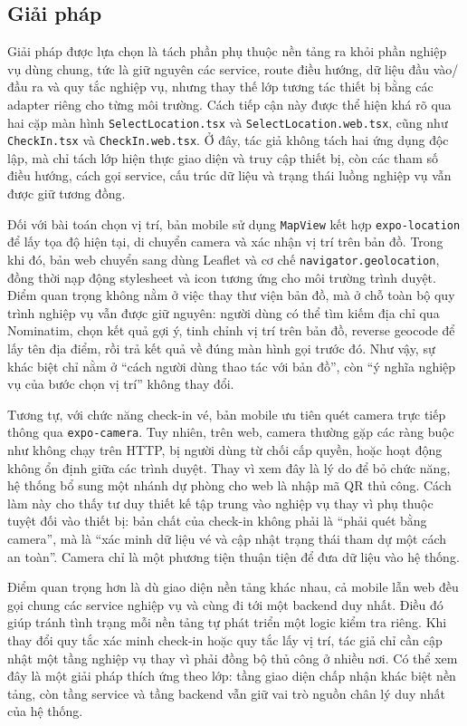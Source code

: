 \documentclass[../DoAn.tex]{subfiles}
\begin{document}
\subsection{Giải pháp}
Giải pháp được lựa chọn là tách phần phụ thuộc nền tảng ra khỏi phần nghiệp vụ dùng chung, tức là giữ nguyên các service, route điều hướng, dữ liệu đầu vào/đầu ra và quy tắc nghiệp vụ, nhưng thay thế lớp tương tác thiết bị bằng các adapter riêng cho từng môi trường. Cách tiếp cận này được thể hiện khá rõ qua hai cặp màn hình \texttt{SelectLocation.tsx} và \texttt{SelectLocation.web.tsx}, cũng như \texttt{CheckIn.tsx} và \texttt{CheckIn.web.tsx}. Ở đây, tác giả không tách hai ứng dụng độc lập, mà chỉ tách lớp hiện thực giao diện và truy cập thiết bị, còn các tham số điều hướng, cách gọi service, cấu trúc dữ liệu và trạng thái luồng nghiệp vụ vẫn được giữ tương đồng.

Đối với bài toán chọn vị trí, bản mobile sử dụng \texttt{MapView} kết hợp \texttt{expo-location} để lấy tọa độ hiện tại, di chuyển camera và xác nhận vị trí trên bản đồ. Trong khi đó, bản web chuyển sang dùng Leaflet và cơ chế \texttt{navigator.geolocation}, đồng thời nạp động stylesheet và icon tương ứng cho môi trường trình duyệt. Điểm quan trọng không nằm ở việc thay thư viện bản đồ, mà ở chỗ toàn bộ quy trình nghiệp vụ vẫn được giữ nguyên: người dùng có thể tìm kiếm địa chỉ qua Nominatim, chọn kết quả gợi ý, tinh chỉnh vị trí trên bản đồ, reverse geocode để lấy tên địa điểm, rồi trả kết quả về đúng màn hình gọi trước đó. Như vậy, sự khác biệt chỉ nằm ở “cách người dùng thao tác với bản đồ”, còn “ý nghĩa nghiệp vụ của bước chọn vị trí” không thay đổi.

Tương tự, với chức năng check-in vé, bản mobile ưu tiên quét camera trực tiếp thông qua \texttt{expo-camera}. Tuy nhiên, trên web, camera thường gặp các ràng buộc như không chạy trên \gls{HTTP}, bị người dùng từ chối cấp quyền, hoặc hoạt động không ổn định giữa các trình duyệt. Thay vì xem đây là lý do để bỏ chức năng, hệ thống bổ sung một nhánh dự phòng cho web là nhập mã \gls{QR} thủ công. Cách làm này cho thấy tư duy thiết kế tập trung vào nghiệp vụ thay vì phụ thuộc tuyệt đối vào thiết bị: bản chất của check-in không phải là “phải quét bằng camera”, mà là “xác minh dữ liệu vé và cập nhật trạng thái tham dự một cách an toàn”. Camera chỉ là một phương tiện thuận tiện để đưa dữ liệu vào hệ thống.

Điểm quan trọng hơn là dù giao diện nền tảng khác nhau, cả mobile lẫn web đều gọi chung các service nghiệp vụ và cùng đi tới một backend duy nhất. Điều đó giúp tránh tình trạng mỗi nền tảng tự phát triển một logic kiểm tra riêng. Khi thay đổi quy tắc xác minh check-in hoặc quy tắc lấy vị trí, tác giả chỉ cần cập nhật một tầng nghiệp vụ thay vì phải đồng bộ thủ công ở nhiều nơi. Có thể xem đây là một giải pháp thích ứng theo lớp: tầng giao diện chấp nhận khác biệt nền tảng, còn tầng service và tầng backend vẫn giữ vai trò nguồn chân lý duy nhất của hệ thống.
\end{document}
